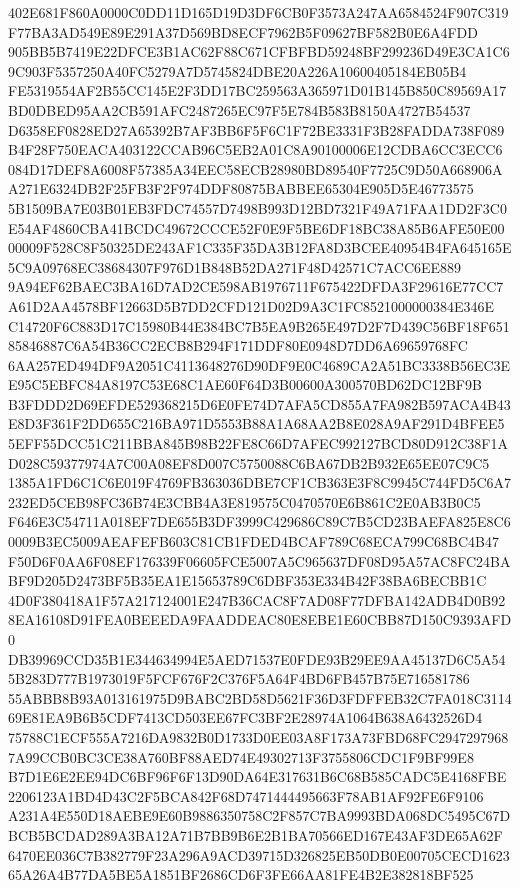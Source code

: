 \documentclass[UTF8,fontset=fandol,zihao=-4,a4paper]{ctexart}
\begin{document}
{{402E681F860A0000C0DD11D165D19D3DF6CB0F3573A247AA6584524F907C319F77BA3AD549E89E291A37D569BD8ECF7962B5F09627BF582B0E6A4FDD
905BB5B7419E22DFCE3B1AC62F88C671CFBFBD59248BF299236D49E3CA1C69C903F5357250A40FC5279A7D5745824DBE20A226A10600405184EB05B4
FE5319554AF2B55CC145E2F3DD17BC259563A365971D01B145B850C89569A17BD0DBED95AA2CB591AFC2487265EC97F5E784B583B8150A4727B54537
D6358EF0828ED27A65392B7AF3BB6F5F6C1F72BE3331F3B28FADDA738F089B4F28F750EACA403122CCAB96C5EB2A01C8A90100006E12CDBA6CC3ECC6
084D17DEF8A6008F57385A34EEC58ECB28980BD89540F7725C9D50A668906AA271E6324DB2F25FB3F2F974DDF80875BABBEE65304E905D5E46773575
5B1509BA7E03B01EB3FDC74557D7498B993D12BD7321F49A71FAA1DD2F3C0E54AF4860CBA41BCDC49672CCCE52F0E9F5BE6DF18BC38A85B6AFE50E00
00009F528C8F50325DE243AF1C335F35DA3B12FA8D3BCEE40954B4FA645165E5C9A09768EC38684307F976D1B848B52DA271F48D42571C7ACC6EE889
9A94EF62BAEC3BA16D7AD2CE598AB1976711F675422DFDA3F29616E77CC7A61D2AA4578BF12663D5B7DD2CFD121D02D9A3C1FC8521000000384E346E
C14720F6C883D17C15980B44E384BC7B5EA9B265E497D2F7D439C56BF18F65185846887C6A54B36CC2ECB8B294F171DDF80E0948D7DD6A69659768FC
6AA257ED494DF9A2051C4113648276D90DF9E0C4689CA2A51BC3338B56EC3EE95C5EBFC84A8197C53E68C1AE60F64D3B00600A300570BD62DC12BF9B
B3FDDD2D69EFDE529368215D6E0FE74D7AFA5CD855A7FA982B597ACA4B43E8D3F361F2DD655C216BA971D5553B88A1A68AA2B8E028A9AF291D4BFEE5
5EFF55DCC51C211BBA845B98B22FE8C66D7AFEC992127BCD80D912C38F1AD028C59377974A7C00A08EF8D007C5750088C6BA67DB2B932E65EE07C9C5
1385A1FD6C1C6E019F4769FB363036DBE7CF1CB363E3F8C9945C744FD5C6A7232ED5CEB98FC36B74E3CBB4A3E819575C0470570E6B861C2E0AB3B0C5
F646E3C54711A018EF7DE655B3DF3999C429686C89C7B5CD23BAEFA825E8C60009B3EC5009AEAFEFB603C81CB1FDED4BCAF789C68ECA799C68BC4B47
F50D6F0AA6F08EF176339F06605FCE5007A5C965637DF08D95A57AC8FC24BABF9D205D2473BF5B35EA1E15653789C6DBF353E334B42F38BA6BECBB1C
4D0F380418A1F57A217124001E247B36CAC8F7AD08F77DFBA142ADB4D0B928EA16108D91FEA0BEEEDA9FAADDEAC80E8EBE1E60CBB87D150C9393AFD0
DB39969CCD35B1E344634994E5AED71537E0FDE93B29EE9AA45137D6C5A545B283D777B1973019F5FCF676F2C376F5A64F4BD6FB457B75E716581786
55ABBB8B93A013161975D9BABC2BD58D5621F36D3FDFFEB32C7FA018C311469E81EA9B6B5CDF7413CD503EE67FC3BF2E28974A1064B638A6432526D4
75788C1ECF555A7216DA9832B0D1733D0EE03A8F173A73FBD68FC29472979687A99CCB0BC3CE38A760BF88AED74E49302713F3755806CDC1F9BF99E8
B7D1E6E2EE94DC6BF96F6F13D90DA64E317631B6C68B585CADC5E4168FBE2206123A1BD4D43C2F5BCA842F68D7471444495663F78AB1AF92FE6F9106
A231A4E550D18AEBE9E60B9886350758C2F857C7BA9993BDA068DC5495C67DBCB5BCDAD289A3BA12A71B7BB9B6E2B1BA70566ED167E43AF3DE65A62F
6470EE036C7B382779F23A296A9ACD39715D326825EB50DB0E00705CECD162365A26A4B77DA5BE5A1851BF2686CD6F3FE66AA81FE4B2E382818BF525
}}
\end{document}

